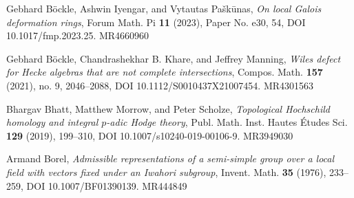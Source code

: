 \begin{refs}
\item[{[BIP23]}] Gebhard B\"ockle, Ashwin Iyengar, and Vytautas Pa\v{s}k\={u}nas, \emph{On local Galois deformation rings}, Forum Math. Pi \textbf{11} (2023), Paper No. e30, 54, DOI 10.1017/fmp.2023.25. MR4660960
\item[{[BKM21]}] Gebhard B\"ockle, Chandrashekhar B. Khare, and Jeffrey Manning, \emph{Wiles defect for Hecke algebras that are not complete intersections}, Compos. Math. \textbf{157} (2021), no. 9, 2046--2088, DOI 10.1112/S0010437X21007454. MR4301563
\item[{[BMS19]}] Bhargav Bhatt, Matthew Morrow, and Peter Scholze, \emph{Topological Hochschild homology and integral $p$-adic Hodge theory}, Publ. Math. Inst. Hautes \'Etudes Sci. \textbf{129} (2019), 199--310, DOI 10.1007/s10240-019-00106-9. MR3949030
\item[{[Bor76]}] Armand Borel, \emph{Admissible representations of a semi-simple group over a local field with vectors fixed under an Iwahori subgroup}, Invent. Math. \textbf{35} (1976), 233--259, DOI 10.1007/BF01390139. MR444849


\end{refs}
